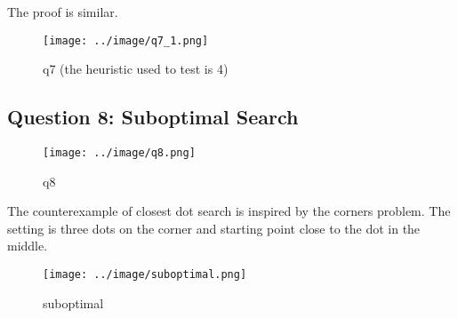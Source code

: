 \documentclass{article}
\begin{document}
The proof is similar.

\begin{figure}[H]
    \centering
    \texttt{[image: ../image/q7\_1.png]}
    \caption{q7 (the heuristic used to test is 4)}
    \label{fig:q7}
\end{figure}

\subsection{Question 8: Suboptimal Search}

\begin{figure}[H]
    \centering
    \texttt{[image: ../image/q8.png]}
    \caption{q8}
    \label{fig:q8}
\end{figure}

The counterexample of closest dot search is inspired by the corners problem. The setting is three dots on the corner and starting point close to the dot in the middle.

\begin{figure}[H]
    \centering
    \texttt{[image: ../image/suboptimal.png]}
    \caption{suboptimal}
    \label{fig:suboptimal}
\end{figure}
\end{document}
